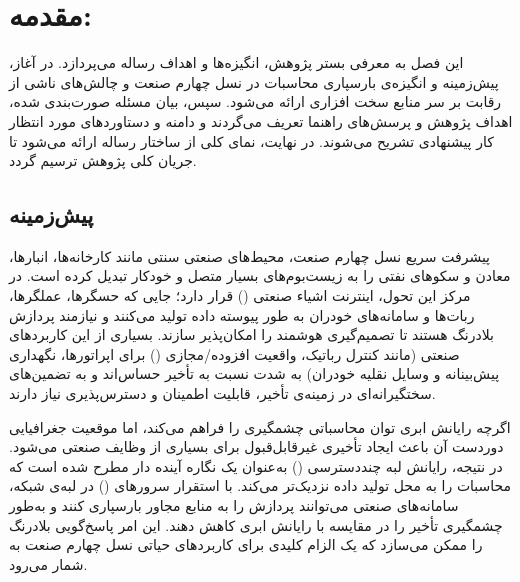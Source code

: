 
\chapter{مقدمه:}\label{chap:intro}

این فصل به معرفی بستر پژوهش، انگیزه‌ها و اهداف رساله می‌پردازد. در آغاز، پیش‌زمینه و انگیزه‌ی بارسپاری محاسبات در نسل چهارم صنعت و چالش‌های ناشی از رقابت بر سر منابع سخت افزاری ارائه می‌شود. سپس، بیان مسئله صورت‌بندی شده، اهداف پژوهش و پرسش‌های راهنما تعریف می‌گردند و دامنه و دستاوردهای مورد انتظار کار پیشنهادی تشریح می‌شوند. در نهایت، نمای کلی از ساختار رساله ارائه می‌شود تا جریان کلی پژوهش ترسیم گردد.

\section{پیش‌زمینه}

پیشرفت سریع نسل‌ چهارم صنعت، محیط‌های صنعتی سنتی مانند کارخانه‌ها، انبارها، معادن و سکوهای نفتی را به زیست‌بوم‌های بسیار متصل و خودکار تبدیل کرده است.  در مرکز این تحول، اینترنت اشیاء صنعتی () قرار دارد؛ جایی که حسگرها، عملگرها، ربات‌ها و سامانه‌های خودران به طور پیوسته داده تولید می‌کنند و نیازمند پردازش بلادرنگ هستند تا تصمیم‌گیری هوشمند را امکان‌پذیر سازند. بسیاری از این کاربردهای صنعتی (مانند کنترل رباتیک، واقعیت افزوده/مجازی () برای اپراتورها، نگهداری پیش‌بینانه و وسایل نقلیه خودران) به شدت نسبت به تأخیر حساس‌اند و به تضمین‌های سختگیرانه‌ای در زمینه‌ی تأخیر، قابلیت اطمینان و دسترس‌پذیری نیاز دارند.

اگرچه رایانش ابری توان محاسباتی چشمگیری را فراهم می‌کند، اما موقعیت جغرافیایی دوردست آن باعث ایجاد تأخیری غیرقابل‌قبول برای بسیاری از وظایف صنعتی می‌شود. در نتیجه، رایانش لبه چنددسترسی () به‌عنوان یک نگاره آینده دار مطرح شده است که محاسبات را به محل تولید داده نزدیک‌تر می‌کند. با استقرار سرورهای ()  در لبه‌ی شبکه، سامانه‌های صنعتی می‌توانند پردازش را به منابع مجاور بار‌سپاری کنند و به‌طور چشمگیری تأخیر را در مقایسه با رایانش ابری کاهش دهند. این امر پاسخ‌گویی بلادرنگ را ممکن می‌سازد که یک الزام کلیدی برای کاربردهای حیاتی نسل چهارم صنعت به شمار می‌رود.

